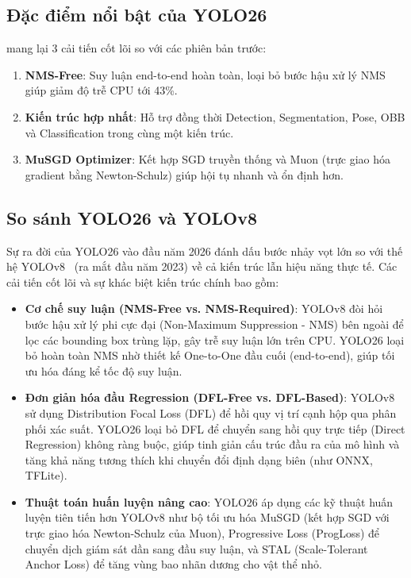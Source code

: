 \subsection{Đặc điểm nổi bật của YOLO26}

\yolo mang lại 3 cải tiến cốt lõi so với các phiên bản trước:

\begin{enumerate}[label=\arabic*)]
    \item \textbf{NMS-Free}: Suy luận end-to-end hoàn toàn, loại bỏ bước hậu xử lý NMS giúp giảm độ trễ CPU tới 43\%.
    \item \textbf{Kiến trúc hợp nhất}: Hỗ trợ đồng thời Detection, Segmentation, Pose, OBB và Classification trong cùng một kiến trúc.
    \item \textbf{MuSGD Optimizer}: Kết hợp SGD truyền thống và Muon (trực giao hóa gradient bằng Newton-Schulz) giúp hội tụ nhanh và ổn định hơn.
\end{enumerate}

\subsection{So sánh YOLO26 và YOLOv8}
\label{subsec:yolo26_vs_yolov8}

Sự ra đời của YOLO26 vào đầu năm 2026 đánh dấu bước nhảy vọt lớn so với thế hệ YOLOv8~\cite{ultralytics} (ra mắt đầu năm 2023) về cả kiến trúc lẫn hiệu năng thực tế. Các cải tiến cốt lõi và sự khác biệt kiến trúc chính bao gồm:

\begin{itemize}
    \item \textbf{Cơ chế suy luận (NMS-Free vs. NMS-Required)}: YOLOv8 đòi hỏi bước hậu xử lý phi cực đại (Non-Maximum Suppression - NMS) bên ngoài để lọc các bounding box trùng lặp, gây trễ suy luận lớn trên CPU. YOLO26 loại bỏ hoàn toàn NMS nhờ thiết kế One-to-One đầu cuối (end-to-end), giúp tối ưu hóa đáng kể tốc độ suy luận.
    \item \textbf{Đơn giản hóa đầu Regression (DFL-Free vs. DFL-Based)}: YOLOv8 sử dụng Distribution Focal Loss (DFL) để hồi quy vị trí cạnh hộp qua phân phối xác suất. YOLO26 loại bỏ DFL để chuyển sang hồi quy trực tiếp (Direct Regression) không ràng buộc, giúp tinh giản cấu trúc đầu ra của mô hình và tăng khả năng tương thích khi chuyển đổi định dạng biên (như ONNX, TFLite).
    \item \textbf{Thuật toán huấn luyện nâng cao}: YOLO26 áp dụng các kỹ thuật huấn luyện tiên tiến hơn YOLOv8 như bộ tối ưu hóa MuSGD (kết hợp SGD với trực giao hóa Newton-Schulz của Muon), Progressive Loss (ProgLoss) để chuyển dịch giám sát dần sang đầu suy luận, và STAL (Scale-Tolerant Anchor Loss) để tăng vùng bao nhãn dương cho vật thể nhỏ.
\end{itemize}

